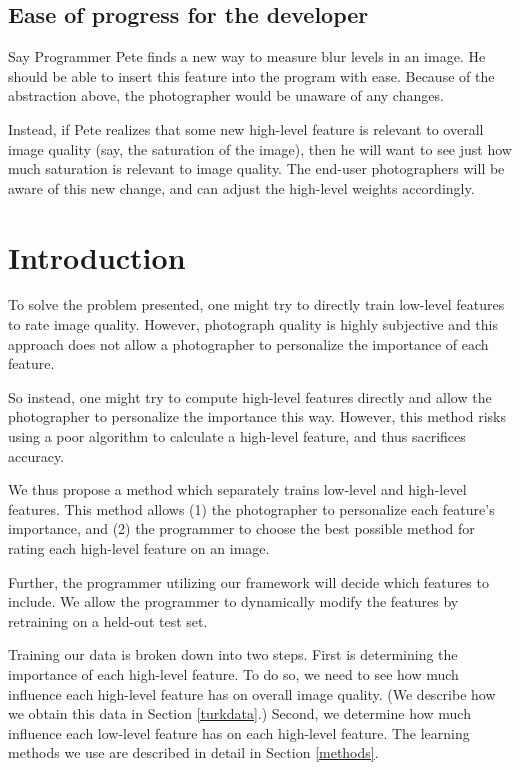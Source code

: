 \documentclass[10pt,twocolumn]{article}
\begin{document}
\subsection{Ease of progress for the developer}
\label{easeofprogramming}
Say Programmer Pete finds a new way to measure blur levels in an image. He should be able to insert this feature into the program with ease. Because of the abstraction above, the photographer would be unaware of any changes.

Instead, if Pete realizes that some new high-level feature is relevant to overall image quality (say, the saturation of the image), then he will want to see just how much saturation is relevant to image quality. The end-user photographers will be aware of this new change, and can adjust the high-level weights accordingly.

\section{Introduction}
To solve the problem presented, one might try to directly train low-level features to rate image quality. However, photograph quality is highly subjective and this approach does not allow a photographer to personalize the importance of each feature.

So instead, one might try to compute high-level features directly and allow the photographer to personalize the importance this way. However, this method risks using a poor algorithm to calculate a high-level feature, and thus sacrifices accuracy.

We thus propose a method which separately trains low-level and high-level features. This method allows (1) the photographer to personalize each feature's importance, and (2) the programmer to choose the best possible method for rating each high-level feature on an image.

Further, the programmer utilizing our framework will decide which features to include. We allow the programmer to dynamically modify the features by retraining on a held-out test set.

Training our data is broken down into two steps. First is determining the importance of each high-level feature. To do so, we need to see how much influence each high-level feature has on overall image quality. (We describe how we obtain this data in Section \ref{turkdata}.) Second, we determine how much influence each low-level feature has on each high-level feature. The learning methods we use are described in detail in Section \ref{methods}.
\end{document}
